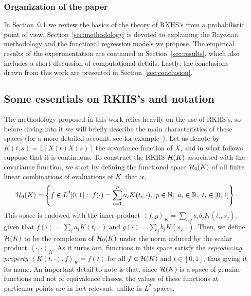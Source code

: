 \documentclass[ba]{imsart}
\numberwithin{equation}{section}
\theoremstyle{plain}
\newcommand{\N}{\mathbb{N}}
\newcommand{\R}{\mathbb{R}}
\newcommand{\Hcal}{\ensuremath\mathcal{H}}
\newcommand\dotprod[2]{\left\langle #1, #2 \right\rangle}
\begin{document}
\subsubsection{Organization of the paper}

In Section~\ref{sec:rkhs} we review the basics of the theory of RKHS's from a probabilistic point of view. Section~\ref{sec:methodology} is devoted to explaining the Bayesian methodology and the functional regression models we propose. The empirical results of the experimentation are contained in Section~\ref{sec:results}, which also includes a short discussion of computational details. Lastly, the conclusions drawn from this work are presented in Section~\ref{sec:conclusion}.

\subsection{Some essentials on RKHS's and notation}\label{sec:rkhs}

The methodology proposed in this work relies heavily on the use of RKHS's, so before diving into it we will briefly describe the main characteristics of these spaces (for a more detailed account, see for example~\citet{berlinet2004reproducing}). Let us denote by \(K(t, s)= \mathbb E[X(t)X(s)]\) the covariance function of \(X\), and in what follows suppose that it is continuous. To construct the RKHS \(\Hcal(K)\) associated with the covariance function, we start by defining the functional space \(\Hcal_0(K)\) of all finite linear combinations of evaluations of \(K\), that is,
\begin{equation}\label{eq:h0}
\Hcal_0(K) = \left\{ f \in L^2[0,1]: \ f(\cdot) = \sum_{i=1}^p a_i K(t_i, \cdot), \ p \in \N, \ a_i \in \R, \ t_i \in [0, 1] \right\}.
\end{equation}
This space is endowed with the inner product \(\dotprod{f}{g}_K = \sum_{i, j} a_i b_j K(t_i, s_j)\), given that \(f(\cdot)=\sum_i a_i K(t_i, \cdot) \) and \(g(\cdot)=\sum_j b_j K(s_j, \cdot)\). Then, we define \(\Hcal(K)\) to be the completion of \(\Hcal_0(K)\) under the norm induced by the scalar product \(\dotprod{\cdot}{\cdot}_K\). As it turns out, functions in this space satisfy the \textit{reproducing property} \(\dotprod{K(t, \cdot)}{f}_K = f(t)\) for all \(f \in \Hcal(K)\) and \(t \in [0, 1]\), thus giving it its name. An important detail to note is that, since \(\Hcal(K)\) is a space of genuine functions and not of equivalence classes, the values of these functions at particular points are in fact relevant, unlike in \(L^2\)-spaces.
\end{document}
